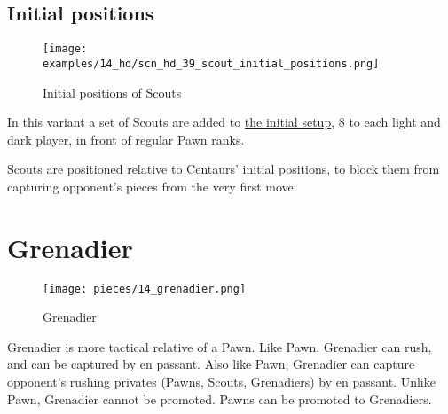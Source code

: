 \subsection*{Initial positions}
\label{sec:Hemera's Dawn/Scout/Initial positions}

\vspace*{-1.2\baselineskip}
\noindent
\begin{figure}[!h]
\texttt{[image: examples/14\_hd/scn\_hd\_39\_scout\_initial\_positions.png]}
\vspace*{-1.3\baselineskip}
\caption{Initial positions of Scouts}
\label{fig:scn_hd_39_scout_initial_positions}
\end{figure}

\vspace*{-0.5\baselineskip}
In this variant a set of Scouts are added to
\hyperref[fig:14_hemera_s_dawn]{the initial setup}, 8 to each light and dark
player, in front of regular Pawn ranks.

Scouts are positioned relative to Centaurs' initial positions, to block them
from capturing opponent's pieces from the very first move.

\clearpage %

\section*{Grenadier}
\label{sec:Hemera's Dawn/Grenadier}

\vspace*{-0.7\baselineskip}
\noindent
\begin{wrapfigure}[10]{l}{0.4\textwidth}
\centering
\texttt{[image: pieces/14\_grenadier.png]}
\vspace*{-1.3\baselineskip}
\caption{Grenadier}
\label{fig:14_grenadier}
\end{wrapfigure}
Grenadier is more tactical relative of a Pawn. Like Pawn, Grenadier can rush, and
can be captured by en passant. Also like Pawn, Grenadier can capture opponent's
rushing privates (Pawns, Scouts, Grenadiers) by en passant. Unlike Pawn, Grenadier
cannot be promoted. Pawns can be promoted to Grenadiers.

